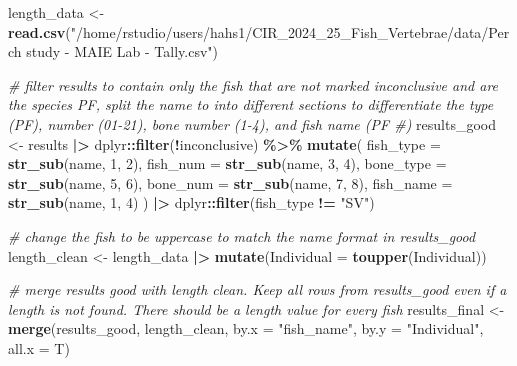 \documentclass[
]{article}
\newenvironment{Shaded}{\begin{snugshade}}{\end{snugshade}}
\newcommand{\AttributeTok}[1]{\textcolor[rgb]{0.13,0.29,0.53}{#1}}
\newcommand{\CommentTok}[1]{\textcolor[rgb]{0.56,0.35,0.01}{\textit{#1}}}
\newcommand{\DecValTok}[1]{\textcolor[rgb]{0.00,0.00,0.81}{#1}}
\newcommand{\FunctionTok}[1]{\textcolor[rgb]{0.13,0.29,0.53}{\textbf{#1}}}
\newcommand{\NormalTok}[1]{#1}
\newcommand{\OtherTok}[1]{\textcolor[rgb]{0.56,0.35,0.01}{#1}}
\newcommand{\SpecialCharTok}[1]{\textcolor[rgb]{0.81,0.36,0.00}{\textbf{#1}}}
\newcommand{\StringTok}[1]{\textcolor[rgb]{0.31,0.60,0.02}{#1}}
\begin{document}
\begin{Shaded}
\begin{Highlighting}[]
\NormalTok{length\_data }\OtherTok{\textless{}{-}} \FunctionTok{read.csv}\NormalTok{(}\StringTok{"/home/rstudio/users/hahs1/CIR\_2024\_25\_Fish\_Vertebrae/data/Perch study {-} MAIE Lab {-} Tally.csv"}\NormalTok{)}

\CommentTok{\# filter results to contain only the fish that are not marked inconclusive and are the species PF, split the name to into different sections to differentiate the type (PF), number (01{-}21), bone number (1{-}4), and fish name (PF \#) }
\NormalTok{results\_good }\OtherTok{\textless{}{-}}\NormalTok{ results }\SpecialCharTok{|\textgreater{}}
\NormalTok{  dplyr}\SpecialCharTok{::}\FunctionTok{filter}\NormalTok{(}\SpecialCharTok{!}\NormalTok{inconclusive) }\SpecialCharTok{\%\textgreater{}\%}
  \FunctionTok{mutate}\NormalTok{(}
    \AttributeTok{fish\_type =} \FunctionTok{str\_sub}\NormalTok{(name, }\DecValTok{1}\NormalTok{, }\DecValTok{2}\NormalTok{),}
    \AttributeTok{fish\_num =} \FunctionTok{str\_sub}\NormalTok{(name, }\DecValTok{3}\NormalTok{, }\DecValTok{4}\NormalTok{),}
    \AttributeTok{bone\_type =} \FunctionTok{str\_sub}\NormalTok{(name, }\DecValTok{5}\NormalTok{, }\DecValTok{6}\NormalTok{),}
    \AttributeTok{bone\_num =} \FunctionTok{str\_sub}\NormalTok{(name, }\DecValTok{7}\NormalTok{, }\DecValTok{8}\NormalTok{),}
    \AttributeTok{fish\_name =} \FunctionTok{str\_sub}\NormalTok{(name, }\DecValTok{1}\NormalTok{, }\DecValTok{4}\NormalTok{)}
\NormalTok{  ) }\SpecialCharTok{|\textgreater{}}
\NormalTok{  dplyr}\SpecialCharTok{::}\FunctionTok{filter}\NormalTok{(fish\_type }\SpecialCharTok{!=} \StringTok{"SV"}\NormalTok{)}

\CommentTok{\# change the fish to be uppercase to match the name format in results\_good}
\NormalTok{length\_clean }\OtherTok{\textless{}{-}}\NormalTok{ length\_data }\SpecialCharTok{|\textgreater{}}
  \FunctionTok{mutate}\NormalTok{(}\AttributeTok{Individual =} \FunctionTok{toupper}\NormalTok{(Individual))}

\CommentTok{\# merge results good with length clean. Keep all rows from results\_good even if a length is not found. There should be a length value for every fish}
\NormalTok{results\_final }\OtherTok{\textless{}{-}} \FunctionTok{merge}\NormalTok{(results\_good, length\_clean, }\AttributeTok{by.x =} \StringTok{"fish\_name"}\NormalTok{, }\AttributeTok{by.y =} \StringTok{"Individual"}\NormalTok{, }\AttributeTok{all.x =}\NormalTok{ T) }
\end{Highlighting}
\end{Shaded}
\end{document}
